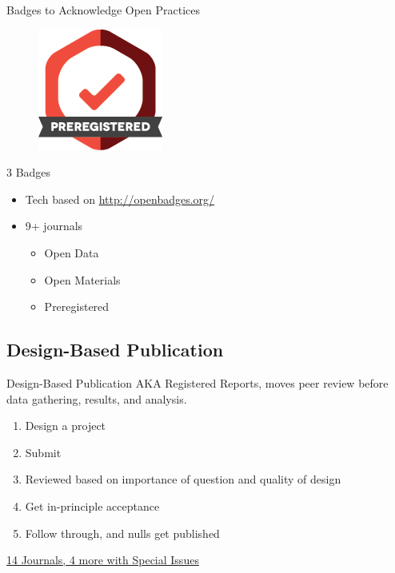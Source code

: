\documentclass{beamer}
\begin{document}
\begin{frame}{Badges to Acknowledge Open Practices}
\begin{figure}
\includegraphics[width=0.9\linewidth]{preregistered.png}
\end{figure}
3 Badges \href{https://osf.io/tvyxz/wiki/home/}{}
\begin{itemize}
\item Tech based on \href{Mozilla Open Badges}{http://openbadges.org/}
\item 9+ journals
\begin{itemize}
\item Open Data
\item Open Materials
\item Preregistered
\end{itemize}
\end{itemize}

\end{frame}
\subsection{Design-Based Publication}
\begin{frame}{Design-Based Publication}
AKA Registered Reports, moves peer review before data gathering, results, and analysis.

\begin{enumerate}[<.->]
\item Design a project
\item Submit
\item Reviewed based on importance of question and quality of design
\item Get in-principle acceptance
\item Follow through, and nulls get published
\end{enumerate}
\href{https://osf.io/8mpji/wiki/home/}{14 Journals, 4 more with Special Issues }
\end{frame}
\end{document}
